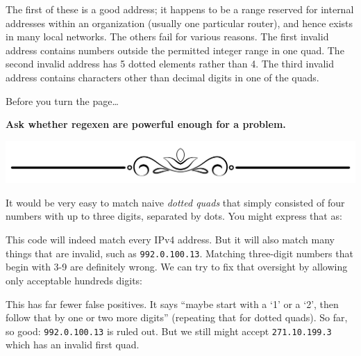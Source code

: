 The first of these is a good address; it happens to be a range reserved
for internal addresses within an organization (usually one particular
router), and hence exists in many local networks. The others fail for
various reasons. The first invalid address contains numbers outside the
permitted integer range in one quad. The second invalid address has 5
dotted elements rather than 4. The third invalid address contains
characters other than decimal digits in one of the quads.

Before you turn the page\ldots{}

\textbf{Ask whether regexen are powerful enough for a problem.}

\includegraphics{images/Elegant-Flourish-Frame-Extrapolated-19.svg}

\newpage

It would be very easy to match naive \emph{dotted quads} that simply
consisted of four numbers with up to three digits, separated by dots.
You might express that as:

\begin{Shaded}
\begin{Highlighting}[]
\OperatorTok{=} 
\end{Highlighting}
\end{Shaded}

This code will indeed match every IPv4 address. But it will also match
many things that are invalid, such as \texttt{992.0.100.13}. Matching
three-digit numbers that begin with 3-9 are definitely wrong. We can try
to fix that oversight by allowing only acceptable hundreds digits:

\begin{Shaded}
\begin{Highlighting}[]
\OperatorTok{=} 
\end{Highlighting}
\end{Shaded}

This has far fewer false positives. It says ``maybe start with a `1' or
a `2', then follow that by one or two more digits'' (repeating that for
dotted quads). So far, so good: \texttt{992.0.100.13} is ruled out. But
we still might accept \texttt{271.10.199.3} which has an invalid first
quad.

